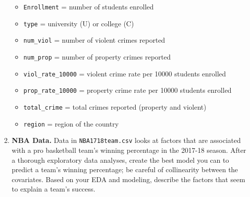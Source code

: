 \documentclass[
]{krantz}
\providecommand{\tightlist}{%
  \setlength{\itemsep}{0pt}\setlength{\parskip}{0pt}}
\begin{document}
\begin{enumerate}
  \begin{itemize}
  \tightlist
  \item
    \texttt{Enrollment} = number of students enrolled
  \item
    \texttt{type} = university (U) or college (C)
  \item
    \texttt{num\_viol} = number of violent crimes reported
  \item
    \texttt{num\_prop} = number of property crimes reported
  \item
    \texttt{viol\_rate\_10000} = violent crime rate per 10000 students enrolled
  \item
    \texttt{prop\_rate\_10000} = property crime rate per 10000 students enrolled
  \item
    \texttt{total\_crime} = total crimes reported (property and violent)
  \item
    \texttt{region} = region of the country
  \end{itemize}
\item
  \textbf{NBA Data.} Data in \texttt{NBA1718team.csv} \citep{rossotti} looks at factors that are associated with a pro basketball team's winning percentage in the 2017-18 season. After a thorough exploratory data analyses, create the best model you can to predict a team's winning percentage; be careful of collinearity between the covariates. Based on your EDA and modeling, describe the factors that seem to explain a team's success.


\end{enumerate}
\end{document}
